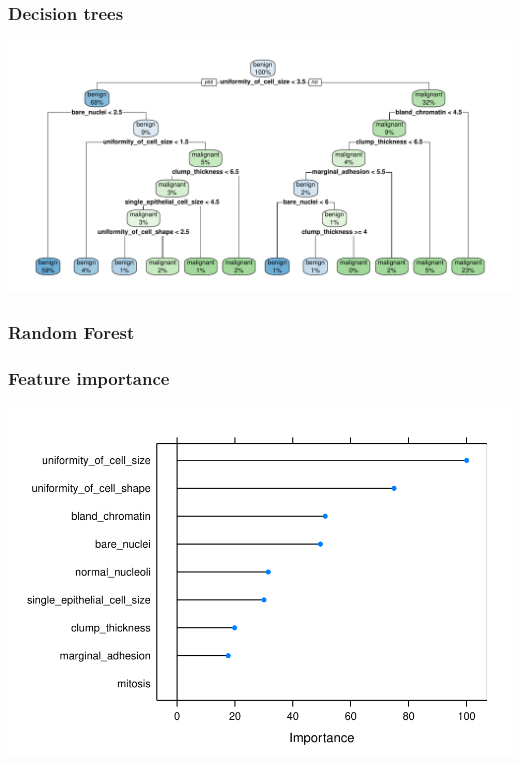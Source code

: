 \documentclass[handout, c, 11pt, xcolor=svgnames, hyperref={colorlinks,citecolor=DeepPink4,linkcolor=DarkRed,urlcolor=DarkBlue}]{beamer} %
\begin{document}
\begin{frame}
	\frametitle{Decision trees}
	
	\begin{center}\includegraphics[width=1\textwidth]{webinar_code_files/figure-latex/unnamed-chunk-12-1} \end{center}
	
\end{frame}

\begin{frame}
	\frametitle{Random Forest}
	
	
\end{frame}

\begin{frame}
	\frametitle{Feature importance}
	
	\begin{center}\includegraphics[width=1\textwidth]{webinar_code_files/figure-latex/unnamed-chunk-11-1.pdf} \end{center}
\end{frame}
\end{document}

